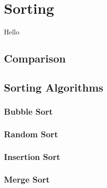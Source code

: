 \chapter{Sorting}

Hello

\section{Comparison}
\csharpsubsection{\csharp}

\section{Sorting Algorithms}

\subsection{Bubble Sort}
\csharpsubsubsection{\csharp}

\subsection{Random Sort}
\csharpsubsubsection{\csharp}

\subsection{Insertion Sort}
\csharpsubsubsection{\csharp}

\subsection{Merge Sort}
\csharpsubsubsection{\csharp}

